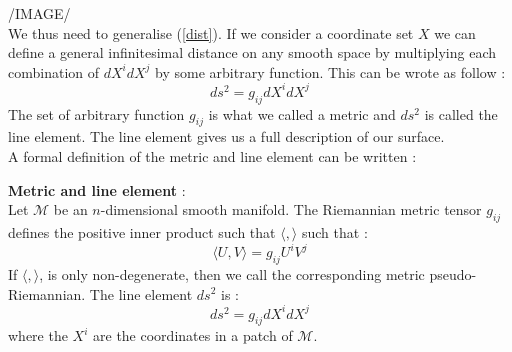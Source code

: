 \documentclass[a4paper,12pt]{article}
\theoremstyle{definition}
\begin{document}
/IMAGE/\\
We thus need to generalise (\ref{dist}).
If we consider a coordinate set $X$ we can define a general infinitesimal distance on any smooth space by multiplying each combination of $dX^idX^j$ by some arbitrary function.
This can be wrote as follow :
\begin{equation*}
	ds^2=g_{ij}dX^idX^j
\end{equation*}
The set of arbitrary function $g_{ij}$ is what we called a metric and $ds^2$ is called the line element.
The line element gives us a full description of our surface.\\
A formal definition of the metric and line element can be written :
\begin{definition}
	\textbf{Metric and line element} :\\
	Let $\mathcal{M}$ be an $n$-dimensional smooth manifold.
	The Riemannian metric tensor $g_{ij}$ defines the positive inner product such that $\langle , \rangle$ such that : 
	\begin{equation*}
		\langle U , V \rangle = g_{ij}U^iV^j
	\end{equation*}
	If $\langle , \rangle$, is only non-degenerate, then we call the corresponding metric pseudo-Riemannian.
	The line element $ds^2$ is :
	\begin{equation*}
		ds^2=g_{ij}dX^idX^j
	\end{equation*}
	where the $X^i$ are the coordinates in a patch of $\mathcal{M}$.
\end{definition}
\end{document}
